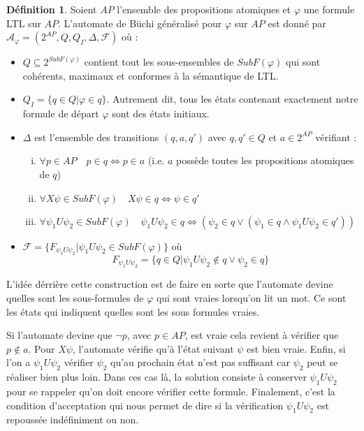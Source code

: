 \documentclass[12pt,a4paper]{article}
\theoremstyle{plain}
\theoremstyle{definition}
\newtheorem{defi}{Définition}
\begin{document}
\begin{defi}
  Soient $AP$ l'ensemble des propositions atomiques et $\varphi$ une formule LTL sur $AP$.
  L'automate de Büchi généralisé pour $\varphi$ sur $AP$ est donné par $\mathcal{A}_\varphi = (2^{AP}, Q, Q_I, \Delta, \mathscr{F})$ où :
  \begin{itemize}
  \item $Q \subseteq 2^{SubF(\varphi)}$ contient tout les sous-ensembles de $SubF(\varphi)$ qui sont cohérents, maximaux et conformes à la sémantique de LTL.
  \item $Q_I = \{ q \in Q | \varphi \in q \}$. Autrement dit, tous les états contenant exactement notre formule de départ $\varphi$ sont des états initiaux.
  \item $\Delta$ est l'ensemble des transitions $(q, a, q')$ avec $q, q' \in Q$ et $a \in 2^{AP}$ vérifiant :
    \begin{enumerate}[(i)]
    \item $\forall p \in AP \quad p \in q \iff p \in a$ (i.e. $a$ possède toutes les propositions atomiques de $q$)
    \item $\forall X\psi \in SubF(\varphi) \quad X\psi \in q \iff \psi \in q'$
    \item $\forall \psi_1 U \psi_2 \in SubF(\varphi) \quad \psi_1 U \psi_2 \in q \iff \left( \psi_2 \in q \lor (\psi_1 \in q \land \psi_1 U \psi_2 \in q')\right)$    
    \end{enumerate}
  \item $\mathscr{F} = \{F_{\psi_1 U \psi_2} | \psi_1 U \psi_2 \in SubF(\varphi)\}$ où
    \[
      F_{\psi_1 U \psi_2} = \{q \in Q | \psi_1 U \psi_2 \not \in q \lor \psi_2\in q \}
    \]
  \end{itemize}
\end{defi}

L'idée dérrière cette construction est de faire en sorte que l'automate devine quelles sont les sous-formules de $\varphi$ qui sont vraies lorsqu'on lit un mot.
Ce sont les états qui indiquent quelles sont les sous formules vraies.

Si l'automate devine que $\lnot p$, avec $p \in AP$, est vraie cela revient à vérifier que $p \not \in a$.
Pour $X \psi$, l'automate vérifie qu'à l'état suivant $\psi$ est bien vraie.
Enfin, si l'on a $\psi_1 U \psi_2$ vérifier $\psi_2$ qu'au prochain état n'est pas suffisant car $\psi_2$ peut se réaliser bien plus loin.
Dans ces cas là, la solution consiste à conserver $\psi_1 U \psi_2$ pour se rappeler qu'on doit encore vérifier cette formule.
Finalement, c'est la condition d'acceptation qui nous permet de dire si la vérification $\psi_1 U \psi_2$ est repoussée indéfiniment ou non.
\end{document}
